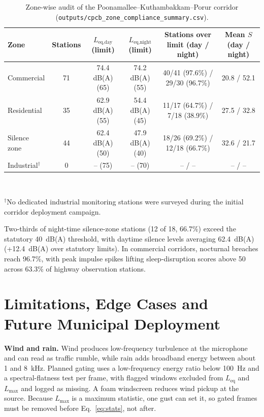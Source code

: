 \documentclass[conference]{IEEEtran}
\newcommand{\Leq}{L_{\text{eq}}}
\newcommand{\Lmax}{L_{\max}}
\begin{document}
\begin{table}[!t]
\caption{Zone-wise audit of the Poonamallee--Kuthambakkam--Porur corridor (\texttt{outputs/cpcb\_zone\_compliance\_summary.csv}).}
\label{tab:audit}
\centering
\small
\renewcommand{\arraystretch}{1.15}
\begin{tabular}{@{}lccccc@{}}
\toprule
Zone & Stations & $L_{\text{eq,day}}$ (limit) & $L_{\text{eq,night}}$ (limit) & Stations over limit (day / night) & Mean $S$ (day / night) \\
\midrule
Commercial & 71 & 74.4 dB(A) (65) & 74.2 dB(A) (55) & 40/41 (97.6\%) / 29/30 (96.7\%) & 20.8 / 52.1 \\
Residential & 35 & 62.9 dB(A) (55) & 54.4 dB(A) (45) & 11/17 (64.7\%) / 7/18 (38.9\%) & 27.5 / 32.8 \\
Silence zone & 44 & 62.4 dB(A) (50) & 47.9 dB(A) (40) & 18/26 (69.2\%) / 12/18 (66.7\%) & 32.6 / 21.7 \\
Industrial$^\dagger$ & 0 & -- (75) & -- (70) & -- / -- & -- / -- \\
\bottomrule
\end{tabular}\\
\vspace{2pt}
\raggedright\footnotesize{$^\dagger$No dedicated industrial monitoring stations were surveyed during the initial corridor deployment campaign.}
\end{table}

Two-thirds of night-time silence-zone stations (12 of 18, 66.7\%) exceed the statutory 40~dB(A) threshold, with daytime silence levels averaging 62.4~dB(A) (+12.4~dB(A) over statutory limits). In commercial corridors, nocturnal breaches reach 96.7\%, with peak impulse spikes lifting sleep-disruption scores above 50 across 63.3\% of highway observation stations.

\section{Limitations, Edge Cases and Future Municipal Deployment}
\label{sec:limits}

\textbf{Wind and rain.} Wind produces low-frequency turbulence at the microphone and can read as traffic rumble, while rain adds broadband energy between about 1 and 8~kHz. Planned gating uses a low-frequency energy ratio below 100~Hz and a spectral-flatness test per frame, with flagged windows excluded from $\Leq$ and $\Lmax$ and logged as missing. A foam windscreen reduces wind pickup at the source. Because $\Lmax$ is a maximum statistic, one gust can set it, so gated frames must be removed before Eq.~\eqref{eq:stats}, not after.
\end{document}
